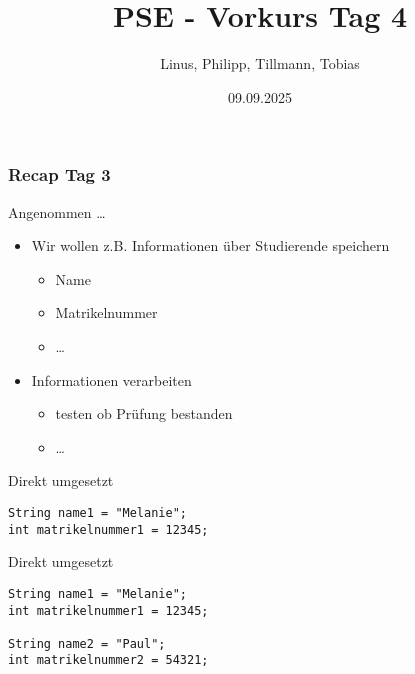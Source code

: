 \documentclass{../../presentation}
\title{PSE - Vorkurs Tag 4}
\author{Linus, Philipp, Tillmann, Tobias}
\institute{FIUS - Fachgruppe Informatik Universität Stuttgart}
\date{09.09.2025}
\begin{document}
\begin{frame}
	\titlepage
\end{frame}

\begin{frame}
	\listoftodos
\end{frame}

\begin{frame}
	\frametitle{Recap Tag 3}
\end{frame}



\begin{frame}{Angenommen \dots}
	\begin{itemize}
		\item Wir wollen z.B. Informationen über Studierende speichern
		      \begin{itemize}
			      \item<2->[\textbullet] Name
			      \item<3->[\textbullet] Matrikelnummer
			      \item<4->[\textbullet] \dots
		      \end{itemize}
		\item<5-> Informationen verarbeiten
		      \begin{itemize}
			      \item<6->[\textbullet] testen ob Prüfung bestanden
			      \item<7->[\textbullet] \dots
		      \end{itemize}
	\end{itemize}
\end{frame}



\begin{frame}[fragile,t]{Direkt umgesetzt}
	\vspace{2.0em}
	\begin{minipage}[t][0.6\textheight][t]{\textwidth}
		\begin{verbatim}
String name1 = "Melanie";
int matrikelnummer1 = 12345;
\end{verbatim}
	\end{minipage}
\end{frame}



\begin{frame}[fragile,t]{Direkt umgesetzt}
	\vspace{2.0em}
	\begin{minipage}[t][0.6\textheight][t]{\textwidth}
		\begin{verbatim}
String name1 = "Melanie";
int matrikelnummer1 = 12345;

String name2 = "Paul";
int matrikelnummer2 = 54321;
\end{verbatim}
	\end{minipage}
\end{frame}
\end{document}
